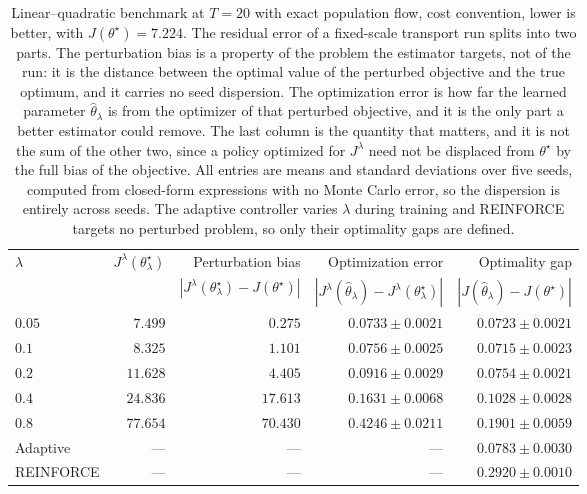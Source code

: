 \begin{table}[H]
\centering
\small
\begin{tabular}{lrrrr}
\toprule
$\lambda$ & $J^\lambda(\theta_\lambda^\star)$ & Perturbation bias & Optimization error & Optimality gap \\
& & $|J^\lambda(\theta_\lambda^\star)-J(\theta^\star)|$ & $|J^\lambda(\widehat\theta_\lambda)-J^\lambda(\theta_\lambda^\star)|$ & $|J(\widehat\theta_\lambda)-J(\theta^\star)|$ \\
\midrule
$0.05$ & $7.499$ & $0.275$ & $0.0733\pm0.0021$ & $0.0723\pm0.0021$ \\
$0.1$ & $8.325$ & $1.101$ & $0.0756\pm0.0025$ & $0.0715\pm0.0023$ \\
$0.2$ & $11.628$ & $4.405$ & $0.0916\pm0.0029$ & $0.0754\pm0.0021$ \\
$0.4$ & $24.836$ & $17.613$ & $0.1631\pm0.0068$ & $0.1028\pm0.0028$ \\
$0.8$ & $77.654$ & $70.430$ & $0.4246\pm0.0211$ & $0.1901\pm0.0059$ \\
\midrule
Adaptive & --- & --- & --- & $0.0783\pm0.0030$ \\
REINFORCE & --- & --- & --- & $0.2920\pm0.0010$ \\
\bottomrule
\end{tabular}
\caption{Linear--quadratic benchmark at $T=20$ with exact population flow, cost convention, lower is better, with $J(\theta^\star)=7.224$. The residual error of a fixed-scale transport run splits into two parts. The perturbation bias is a property of the problem the estimator targets, not of the run: it is the distance between the optimal value of the perturbed objective and the true optimum, and it carries no seed dispersion. The optimization error is how far the learned parameter $\widehat\theta_\lambda$ is from the optimizer of that perturbed objective, and it is the only part a better estimator could remove. The last column is the quantity that matters, and it is not the sum of the other two, since a policy optimized for $J^\lambda$ need not be displaced from $\theta^\star$ by the full bias of the objective. All entries are means and standard deviations over five seeds, computed from closed-form expressions with no Monte Carlo error, so the dispersion is entirely across seeds. The adaptive controller varies $\lambda$ during training and REINFORCE targets no perturbed problem, so only their optimality gaps are defined.}
\label{tab:lq-decomposition}
\end{table}
